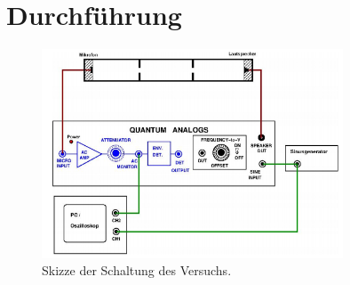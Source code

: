 \section{Durchführung}
\label{sec:durchfuehrung}

\begin{figure}[H]
    \centering
    \includegraphics[width=0.8\textwidth]{build/Schaltung.PNG}
    \caption{Skizze der Schaltung des Versuchs. \cite{Anleitung}}
    \label{fig:aufbau}
\end{figure}
